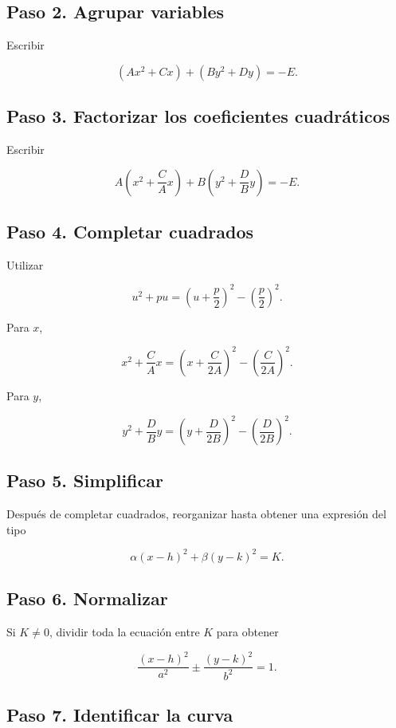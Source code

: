 \documentclass[12pt]{article}
\begin{document}
\subsection*{Paso 2. Agrupar variables}

Escribir

\[
(Ax^2+Cx)+(By^2+Dy)=-E.
\]

\subsection*{Paso 3. Factorizar los coeficientes cuadráticos}

Escribir

\[
A\left(
x^2+\frac{C}{A}x
\right)
+
B\left(
y^2+\frac{D}{B}y
\right)
=
-E.
\]

\subsection*{Paso 4. Completar cuadrados}

Utilizar

\[
u^2+pu
=
\left(
u+\frac{p}{2}
\right)^2
-
\left(
\frac{p}{2}
\right)^2.
\]

Para \(x\),

\[
x^2+\frac{C}{A}x
=
\left(
x+\frac{C}{2A}
\right)^2
-
\left(
\frac{C}{2A}
\right)^2.
\]

Para \(y\),

\[
y^2+\frac{D}{B}y
=
\left(
y+\frac{D}{2B}
\right)^2
-
\left(
\frac{D}{2B}
\right)^2.
\]

\subsection*{Paso 5. Simplificar}

Después de completar cuadrados, reorganizar hasta obtener una expresión
del tipo

\[
\alpha(x-h)^2+\beta(y-k)^2=K.
\]

\subsection*{Paso 6. Normalizar}

Si \(K\neq0\), dividir toda la ecuación entre \(K\) para obtener

\[
\frac{(x-h)^2}{a^2}
\pm
\frac{(y-k)^2}{b^2}
=
1.
\]

\subsection*{Paso 7. Identificar la curva}
\end{document}
